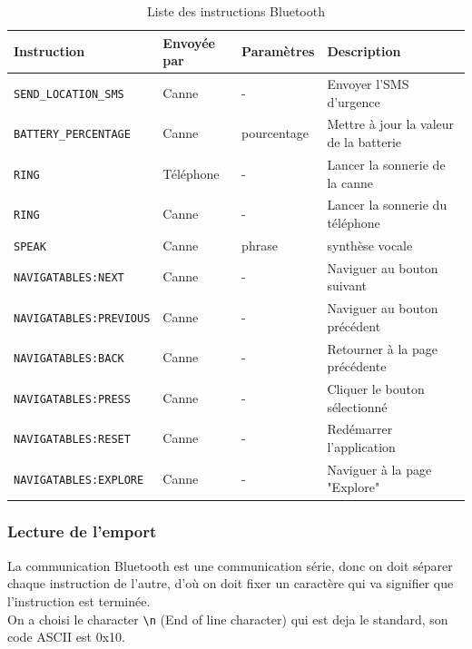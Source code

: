 \bgroup
\def\arraystretch{1.5}
\begin{table}[!htbp]
    \centering
    \begin{tabular}{|C{6cm}|C{2cm}|C{2cm}|C{6.3cm}|}
        \hline
        Instruction & Envoyée par & Paramètres & Description \\
        \hline
        \verb|SEND_LOCATION_SMS| & Canne & - & Envoyer l'SMS d'urgence \\
        \hline
        \verb|BATTERY_PERCENTAGE| & Canne & pourcentage & Mettre à jour la valeur de la batterie \\
        \hline
        \verb|RING| & Téléphone & - & Lancer la sonnerie de la canne \\
        \hline
        \verb|RING| & Canne & - & Lancer la sonnerie du téléphone \\
        \hline
        \verb|SPEAK| & Canne & phrase & synthèse vocale \\
        \hline
        \verb|NAVIGATABLES:NEXT| & Canne & - & Naviguer au bouton suivant \\
        \hline
        \verb|NAVIGATABLES:PREVIOUS| & Canne & - & Naviguer au bouton précédent \\
        \hline
        \verb|NAVIGATABLES:BACK| & Canne & - & Retourner à la page précédente \\
        \hline
        \verb|NAVIGATABLES:PRESS| & Canne & - & Cliquer le bouton sélectionné \\
        \hline
        \verb|NAVIGATABLES:RESET| & Canne & - & Redémarrer l'application \\
        \hline
        \verb|NAVIGATABLES:EXPLORE| & Canne & - & Naviguer à la page "Explore" \\
        \hline
    \end{tabular}
    \caption{Liste des instructions Bluetooth}
    \label{bluetooth-commandes}
\end{table}
\egroup

\FloatBarrier

\subsubsection{Lecture de l'emport}
La communication Bluetooth est une communication série, donc on doit séparer chaque instruction de l'autre, d'où on doit fixer un caractère qui va signifier que l'instruction est terminée. \\
On a choisi le character \verb|\n| (End of line character) qui est deja le standard, son code \acrshort{ASCII} est 0x10.

